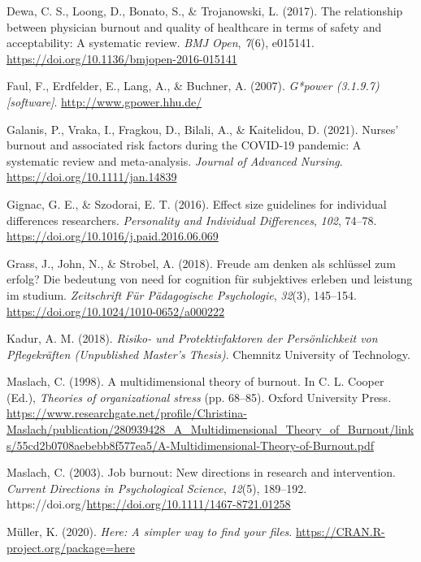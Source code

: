\documentclass[
  man]{apa6}
\newlength{\cslhangindent}
\newenvironment{CSLReferences}[2] %
 {\begin{list}{}{%
  \setlength{\itemindent}{0pt}
  \setlength{\leftmargin}{0pt}
  \setlength{\parsep}{0pt}
  \ifodd #1
   \setlength{\leftmargin}{\cslhangindent}
   \setlength{\itemindent}{-1\cslhangindent}
  \fi
  \setlength{\itemsep}{#2\baselineskip}}}
 {\end{list}}
\begin{document}
\begin{CSLReferences}{1}{0}
Dewa, C. S., Loong, D., Bonato, S., \& Trojanowski, L. (2017). The relationship between physician burnout and quality of healthcare in terms of safety and acceptability: A systematic review. \emph{BMJ Open}, \emph{7}(6), e015141. \url{https://doi.org/10.1136/bmjopen-2016-015141}

Faul, F., Erdfelder, E., Lang, A., \& Buchner, A. (2007). \emph{G*power (3.1.9.7) {[}software{]}}. \url{http://www.gpower.hhu.de/}

Galanis, P., Vraka, I., Fragkou, D., Bilali, A., \& Kaitelidou, D. (2021). Nurses' burnout and associated risk factors during the COVID-19 pandemic: A systematic review and meta-analysis. \emph{Journal of Advanced Nursing}. \url{https://doi.org/10.1111/jan.14839}

Gignac, G. E., \& Szodorai, E. T. (2016). Effect size guidelines for individual differences researchers. \emph{Personality and Individual Differences}, \emph{102}, 74--78. \url{https://doi.org/10.1016/j.paid.2016.06.069}

Grass, J., John, N., \& Strobel, A. (2018). Freude am denken als schlüssel zum erfolg? Die bedeutung von need for cognition für subjektives erleben und leistung im studium. \emph{Zeitschrift Für Pädagogische Psychologie}, \emph{32}(3), 145--154. \url{https://doi.org/10.1024/1010-0652/a000222}

Kadur, A. M. (2018). \emph{{Risiko}- und {Protektivfaktoren} der {Persönlichkeit} von {Pflegekräften} ({Unpublished Master's Thesis})}. Chemnitz University of Technology.

Maslach, C. (1998). A multidimensional theory of burnout. In C. L. Cooper (Ed.), \emph{Theories of organizational stress} (pp. 68--85). Oxford University Press. \url{https://www.researchgate.net/profile/Christina-Maslach/publication/280939428_A_Multidimensional_Theory_of_Burnout/links/55cd2b0708aebebb8f577ea5/A-Multidimensional-Theory-of-Burnout.pdf}

Maslach, C. (2003). Job burnout: New directions in research and intervention. \emph{Current Directions in Psychological Science}, \emph{12}(5), 189--192. https://doi.org/\url{https://doi.org/10.1111/1467-8721.01258}

Müller, K. (2020). \emph{Here: A simpler way to find your files}. \url{https://CRAN.R-project.org/package=here}


\end{CSLReferences}
\end{document}
